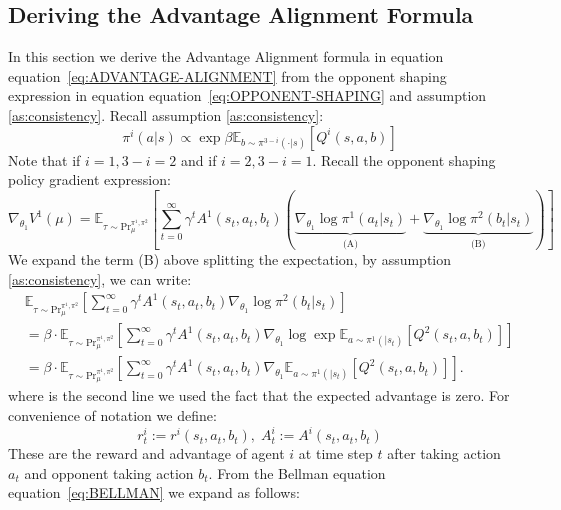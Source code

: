 \documentclass{article} \usepackage{iclr2025_conference,times}
\def\eqref#1{equation~\ref{#1}}
\begin{document}
\subsection{Deriving the Advantage Alignment Formula}
\label{app:AA-derivation}
In this section we derive the Advantage Alignment formula in equation \eqref{eq:ADVANTAGE-ALIGNMENT} from the opponent shaping expression in equation \eqref{eq:OPPONENT-SHAPING} and assumption \ref{as:consistency}. Recall assumption \ref{as:consistency}:
\[
    \pi^i(a | s) \propto \exp{ \beta \mathbb{E}_{b\sim \pi^{3-i}(\cdot|s)}[ Q^i(s, a,b)]}
\]
Note that if $i=1, 3-i = 2$ and if $i=2, 3-i=1$. 
Recall the opponent shaping policy gradient expression:
\[
    \nabla_{\theta_1}V^{1}(\mu) = \mathbb{E}_{\tau \sim \text{Pr}_{\mu}^{\pi^1, \pi^2}} \left[\sum_{t=0}^\infty \gamma^t A^1(s_t, a_t, b_t) \left(\underbrace{\nabla_{\theta_1} \log \pi^1 (a_t | s_t)}_{\text{(A)}} + \underbrace{\nabla_{\theta_1} \log \pi^2 (b_t | s_t)}_{\text{(B)}}\right)\right]
\]
We expand the term (B) above splitting the expectation, by assumption \ref{as:consistency}, we can write:
\begin{align*}
    &\mathbb{E}_{\tau \sim \text{Pr}_{\mu}^{\pi^1, \pi^2}} \left[\sum_{t=0}^\infty \gamma^t A^1(s_t, a_t, b_t)\nabla_{\theta_1} \log \pi^2 (b_t | s_t)\right] \\
    &= \beta \cdot \mathbb{E}_{\tau \sim \text{Pr}_{\mu}^{\pi^1, \pi^2}} \left[\sum_{t=0}^\infty \gamma^t A^1(s_t, a_t, b_t)\nabla_{\theta_1} \log \exp \mathbb{E}_{a \sim \pi^1(|s_t)} [Q^2(s_t, a, b_t)]\right]\\
    &= \beta \cdot\mathbb{E}_{\tau \sim \text{Pr}_{\mu}^{\pi^1, \pi^2}} \left[\sum_{t=0}^\infty \gamma^t A^1(s_t, a_t, b_t)\nabla_{\theta_1}\mathbb{E}_{a \sim \pi^1(|s_t)} [Q^2(s_t, a, b_t)]\right].
\end{align*}
where is the second line we used the fact that the expected advantage is zero. 
For convenience of notation we define:
\[
    r^i_t := r^i(s_t, a_t, b_t), \; A^i_t := A^i(s_t, a_t, b_t) 
\]
These are the reward and advantage of agent $i$ at time step $t$ after taking action $a_t$ and opponent taking action $b_t$. From the Bellman equation \eqref{eq:BELLMAN} we expand as follows:
\end{document}
